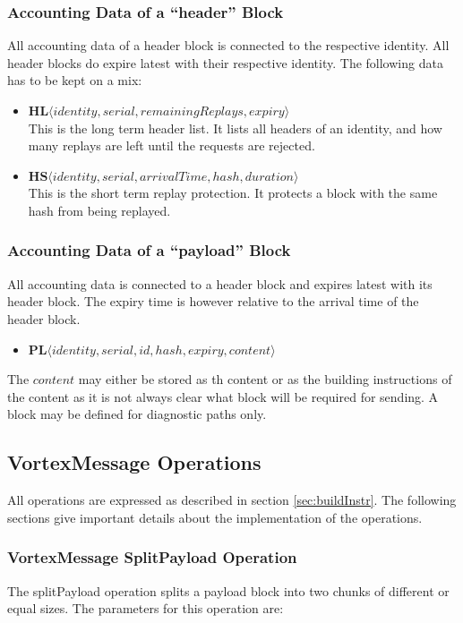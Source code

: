 \subsubsection{Accounting Data of a ``header'' Block}
All accounting data of a header block is connected to the respective identity. All header blocks do expire latest with their respective identity. The following data has to be kept on a mix:
\begin{itemize}
	\item $\mathbf{HL}\langle identity, serial, remainingReplays, expiry\rangle$\\
	This is the long term header list. It lists all headers of an identity, and how many replays are left until the requests are rejected.
	\item $\mathbf{HS}\langle identity, serial, arrivalTime, hash, duration \rangle$\\
	This is the short term replay protection. It protects a block with the same hash from being replayed.
\end{itemize}

\subsubsection{Accounting Data of a ``payload'' Block}
All accounting data is connected to a header block and expires latest with its header block. The expiry time is however relative to the arrival time of the header block.
\begin{itemize}
	\item $\mathbf{PL}\langle identity, serial, id, hash, expiry, content\rangle$\\
\end{itemize}

The $content$ may either be stored as th content or as the building instructions of the content as it is not always clear what block will be required for sending. A block may be defined for diagnostic paths only.

\subsection{VortexMessage Operations}
All operations are expressed as described in section \ref{sec:buildInstr}. The following sections give important details about the implementation of the operations.

\subsubsection{VortexMessage SplitPayload Operation}
The splitPayload operation splits a payload block into two chunks of different or equal sizes. The parameters for this operation are:

